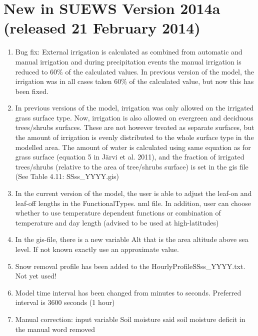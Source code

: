 \documentclass[letterpaper,10pt,english]{sphinxmanual}
\begin{document}
\section{New in SUEWS Version 2014a (released 21 February 2014)}
\label{\detokenize{version-history:new-in-suews-version-2014a-released-21-february-2014}}\begin{enumerate}
\item {} 
Bug fix: External irrigation is calculated as combined from automatic
and manual irrigation and during precipitation events the manual
irrigation is reduced to 60\% of the calculated values. In previous
version of the model, the irrigation was in all cases taken 60\% of
the calculated value, but now this has been fixed.

\item {} 
In previous versions of the model, irrigation was only allowed on the
irrigated grass surface type. Now, irrigation is also allowed on
evergreen and deciduous trees/shrubs surfaces. These are not however
treated as separate surfaces, but the amount of irrigation is evenly
distributed to the whole surface type in the modelled area. The
amount of water is calculated using same equation as for grass
surface (equation 5 in Järvi et al. 2011), and the fraction of
irrigated trees/shrubs (relative to the area of tree/shrubs surface)
is set in the gis file (See Table 4.11: SSss\_YYYY.gis)

\item {} 
In the current version of the model, the user is able to adjust the
leaf-on and leaf-off lengths in the FunctionalTypes. nml file. In
addition, user can choose whether to use temperature dependent
functions or combination of temperature and day length (advised to be
used at high-latitudes)

\item {} 
In the gis-file, there is a new variable Alt that is the area
altitude above sea level. If not known exactly use an approximate
value.

\item {} 
Snow removal profile has been added to the
HourlyProfileSSss\_YYYY.txt. Not yet used!

\item {} 
Model time interval has been changed from minutes to seconds.
Preferred interval is 3600 seconds (1 hour)

\item {} 
Manual correction: input variable Soil moisture said soil moisture
deficit in the manual \textendash{} word removed


\end{enumerate}
\end{document}
